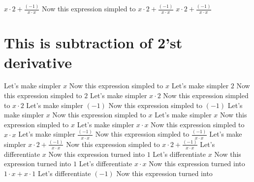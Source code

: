 \documentclass[14pt]{article}
\begin{document}
$x\cdot 2+\frac {(-1)}{x\cdot x}$
\newline
Now this expression simpled to 
$x\cdot 2+\frac {(-1)}{x\cdot x}$
\newline
$x\cdot 2+\frac {(-1)}{x\cdot x}$\section{This is subtraction of 2'st derivative}
Let's make simpler 
$x$
\newline
Now this expression simpled to 
$x$
\newline
Let's make simpler 
$2$
\newline
Now this expression simpled to 
$2$
\newline
Let's make simpler 
$x\cdot 2$
\newline
Now this expression simpled to 
$x\cdot 2$
\newline
Let's make simpler 
$(-1)$
\newline
Now this expression simpled to 
$(-1)$
\newline
Let's make simpler 
$x$
\newline
Now this expression simpled to 
$x$
\newline
Let's make simpler 
$x$
\newline
Now this expression simpled to 
$x$
\newline
Let's make simpler 
$x\cdot x$
\newline
Now this expression simpled to 
$x\cdot x$
\newline
Let's make simpler 
$\frac {(-1)}{x\cdot x}$
\newline
Now this expression simpled to 
$\frac {(-1)}{x\cdot x}$
\newline
Let's make simpler 
$x\cdot 2+\frac {(-1)}{x\cdot x}$
\newline
Now this expression simpled to 
$x\cdot 2+\frac {(-1)}{x\cdot x}$
\newline
Let's differentiate 
$x$
\newline
Now this expression turned into 
$1$
\newline
Let's differentiate 
$x$
\newline
Now this expression turned into 
$1$
\newline
Let's differentiate 
$x\cdot x$
\newline
Now this expression turned into 
$1\cdot x+x\cdot 1$
\newline
Let's differentiate 
$(-1)$
\newline
Now this expression turned into 
\end{document}
